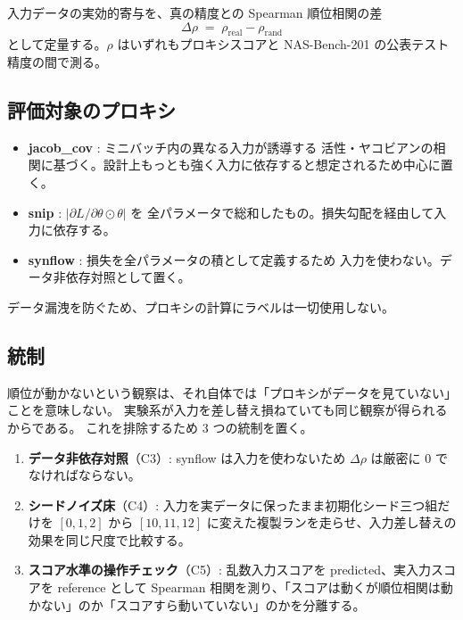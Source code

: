 \documentclass[11pt]{article}
\begin{document}
入力データの実効的寄与を、真の精度との Spearman 順位相関の差
\begin{equation}
\Delta\rho \;=\; \rho_{\mathrm{real}} - \rho_{\mathrm{rand}}
\end{equation}
として定量する。$\rho$ はいずれもプロキシスコアと NAS-Bench-201 の公表テスト精度の間で測る。

\subsection{評価対象のプロキシ}

\begin{itemize}
\item \textbf{jacob\_cov} \cite{mellor2021naswot}: ミニバッチ内の異なる入力が誘導する
活性・ヤコビアンの相関に基づく。設計上もっとも強く入力に依存すると想定されるため中心に置く。
\item \textbf{snip} \cite{lee2019snip}: $|\partial L/\partial\theta \odot \theta|$ を
全パラメータで総和したもの。損失勾配を経由して入力に依存する。
\item \textbf{synflow} \cite{tanaka2020synflow}: 損失を全パラメータの積として定義するため
入力を使わない。データ非依存対照として置く。
\end{itemize}

データ漏洩を防ぐため、プロキシの計算にラベルは一切使用しない。

\subsection{統制}

順位が動かないという観察は、それ自体では「プロキシがデータを見ていない」ことを意味しない。
実験系が入力を差し替え損ねていても同じ観察が得られるからである。
これを排除するため 3 つの統制を置く。

\begin{enumerate}
\item \textbf{データ非依存対照}（C3）: synflow は入力を使わないため $\Delta\rho$ は厳密に $0$ でなければならない。
\item \textbf{シードノイズ床}（C4）: 入力を実データに保ったまま初期化シード三つ組だけを
$[0,1,2]$ から $[10,11,12]$ に変えた複製ランを走らせ、入力差し替えの効果を同じ尺度で比較する。
\item \textbf{スコア水準の操作チェック}（C5）: 乱数入力スコアを predicted、実入力スコアを reference として
Spearman 相関を測り、「スコアは動くが順位相関は動かない」のか「スコアすら動いていない」のかを分離する。
\end{enumerate}
\end{document}
